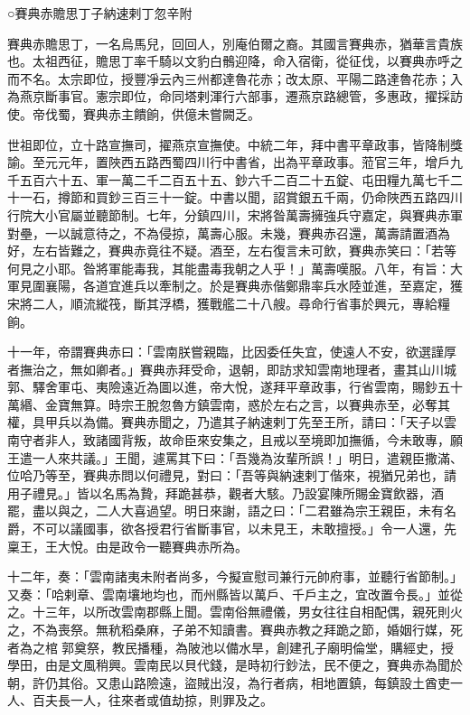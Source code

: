 
\begin{pinyinscope}

 ○賽典赤贍思丁子納速剌丁忽辛附



 賽典赤贍思丁，一名烏馬兒，回回人，別庵伯爾之裔。其國言賽典赤，猶華言貴族也。太祖西征，贍思丁率千騎以文豹白鶻迎降，命入宿衛，從征伐，以賽典赤呼之而不名。太宗即位，授豐凈云內三州都達魯花赤；改太原、平陽二路達魯花赤；入為燕京斷事官。憲宗即位，命同塔剌渾行六部事，遷燕京路總管，多惠政，擢採訪使。帝伐蜀，賽典赤主饋餉，供億未嘗闕乏。



 世祖即位，立十路宣撫司，擢燕京宣撫使。中統二年，拜中書平章政事，皆降制獎諭。至元元年，置陜西五路西蜀四川行中書省，出為平章政事。蒞官三年，增戶九千五百六十五、軍一萬二千二百五十五、鈔六千二百二十五錠、屯田糧九萬七千二十一石，撙節和買鈔三百三十一錠。中書以聞，詔賞銀五千兩，仍命陜西五路四川行院大小官屬並聽節制。七年，分鎮四川，宋將昝萬壽擁強兵守嘉定，與賽典赤軍對壘，一以誠意待之，不為侵掠，萬壽心服。未幾，賽典赤召還，萬壽請置酒為好，左右皆難之，賽典赤竟往不疑。酒至，左右復言未可飲，賽典赤笑曰：「若等何見之小耶。昝將軍能毒我，其能盡毒我朝之人乎！」萬壽嘆服。八年，有旨：大軍見圍襄陽，各道宜進兵以牽制之。於是賽典赤偕鄭鼎率兵水陸並進，至嘉定，獲宋將二人，順流縱筏，斷其浮橋，獲戰艦二十八艘。尋命行省事於興元，專給糧餉。



 十一年，帝謂賽典赤曰：「雲南朕嘗親臨，比因委任失宜，使遠人不安，欲選謹厚者撫治之，無如卿者。」賽典赤拜受命，退朝，即訪求知雲南地理者，畫其山川城郭、驛舍軍屯、夷險遠近為圖以進，帝大悅，遂拜平章政事，行省雲南，賜鈔五十萬緡、金寶無算。時宗王脫忽魯方鎮雲南，惑於左右之言，以賽典赤至，必奪其權，具甲兵以為備。賽典赤聞之，乃遣其子納速剌丁先至王所，請曰：「天子以雲南守者非人，致諸國背叛，故命臣來安集之，且戒以至境即加撫循，今未敢專，願王遣一人來共議。」王聞，遽罵其下曰：「吾幾為汝輩所誤！」明日，遣親臣撒滿、位哈乃等至，賽典赤問以何禮見，對曰：「吾等與納速剌丁偕來，視猶兄弟也，請用子禮見。」皆以名馬為贄，拜跪甚恭，觀者大駭。乃設宴陳所賜金寶飲器，酒罷，盡以與之，二人大喜過望。明日來謝，語之曰：「二君雖為宗王親臣，未有名爵，不可以議國事，欲各授君行省斷事官，以未見王，未敢擅授。」令一人還，先稟王，王大悅。由是政令一聽賽典赤所為。



 十二年，奏：「雲南諸夷未附者尚多，今擬宣慰司兼行元帥府事，並聽行省節制。」又奏：「哈剌章、雲南壤地均也，而州縣皆以萬戶、千戶主之，宜改置令長。」並從之。十三年，以所改雲南郡縣上聞。雲南俗無禮儀，男女往往自相配偶，親死則火之，不為喪祭。無秔稻桑麻，子弟不知讀書。賽典赤教之拜跪之節，婚姻行媒，死者為之棺郭奠祭，教民播種，為陂池以備水旱，創建孔子廟明倫堂，購經史，授學田，由是文風稍興。雲南民以貝代錢，是時初行鈔法，民不便之，賽典赤為聞於朝，許仍其俗。又患山路險遠，盜賊出沒，為行者病，相地置鎮，每鎮設土酋吏一人、百夫長一人，往來者或值劫掠，則罪及之。




\end{pinyinscope}
